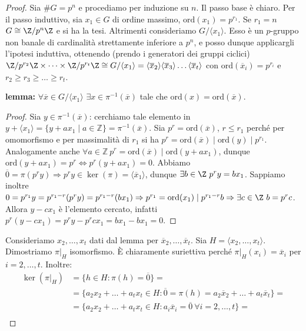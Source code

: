 \begin{proof}
    Sia $\#G = p^n$ e procediamo per induzione su $n$. Il passo base è chiaro.
    Per il passo induttivo, sia $ x_1 \in G$ di ordine massimo, $\text{ord}(x_1) = p^{r_1}$. Se $r_1 = n$ $G \cong \Z/p^n\Z$ e si ha la tesi. Altrimenti consideriamo $G/\langle x_1 \rangle$. Esso è un $p$-gruppo non banale di cardinalità strettamente inferiore a $p^n$, e posso dunque applicargli l'ipotesi induttiva, ottenendo (prendo i generatori dei gruppi ciclici) $\Z/p^{r_2}\Z \times \dots \times \Z/p^{r_t}\Z \cong G/\langle x_1 \rangle = \langle \overline x_2 \rangle \langle \overline x_3 \rangle \dots  \langle \overline x_t \rangle $ con $\text{ord}(\overline x_i) = p^{r_i}$ e $r_2 \geq r_3 \geq \dots \geq r_t$.

    \textbf{lemma:} $\forall \overline x \in G/\langle x_1 \rangle$ $\exists x \in \pi^{-1}(\overline x)$ tale che $\text{ord}(x) = \text{ord}(\overline x)$.
    \begin{proof}
        Sia $y \in \pi^{-1}(\overline x)$: cerchiamo tale elemento in $y + \langle x_1 \rangle = \{y + a x_1 \mid a \in \mathbb{Z}\} = \pi^{-1}(\overline x)$. Sia $p^r = \text{ord}(\overline x)$, $r \leq r_1$ perché per omomorfismo e per massimalità di $r_1$ si ha $p^r = \text{ord}(\overline x) \mid \text{ord}(y) \mid p^{r_1}$. Analogamente anche $\forall a \in \mathbb{Z} \ p^r = \text{ord}(\overline x) \mid \text{ord}(y + a x_1)$, dunque $\text{ord}(y + a x_1) = p^r \Leftrightarrow p^r(y + a x_1) = 0$. Abbiamo $\overline0 = \pi(p^r y) \Rightarrow p^r y \in \ker(\pi) = \langle \overline x_1 \rangle$, dunque $\exists b \in \Z \ p^ry = bx_1$. Sappiamo inoltre $0 = p^{r_1}y = p^{r_1-r}(p^r y) = p^{r_1-r}(b x_1) \Rightarrow p^{r_1} = \text{ord}(x_1) \mid p^{r_1-r}b \Rightarrow \exists c \in \Z \ b = p^rc$. Allora $y-cx_1$ è l'elemento cercato, infatti $p^r(y-cx_1) = p^ry - p^rcx_1 = b x_1 - bx_1 = 0$.
     \end{proof}
    Consideriamo $x_2, \dots, x_t$ dati dal lemma per $\overline x_2, \dots , \overline x_t$. Sia $H = \langle x_2,\dots, x_t \rangle$. Dimostriamo $\pi|_H$ isomorfismo. È chiaramente suriettiva perché $\pi|_H(x_i) = \overline x_i$ per $i=2,\dots,t$. Inoltre:
    \begin{align}
    \ker(\pi|_H) & = \{h \in H : \pi(h) =\overline 0 \} =  \nonumber \\
    & = \{a_2 x_2+\dots+a_t x_t \in H :  \overline 0 = \pi(h) = a_2\overline x_2+\dots+a_t\overline x_t \}  =  \nonumber \\
    & =  \{a_2 x_2+\dots+a_t x_t \in H : a_i\overline x_i = \overline 0 \ \forall i = 2,\dots, t\}  = \nonumber \\

\end{align}
\end{proof}
